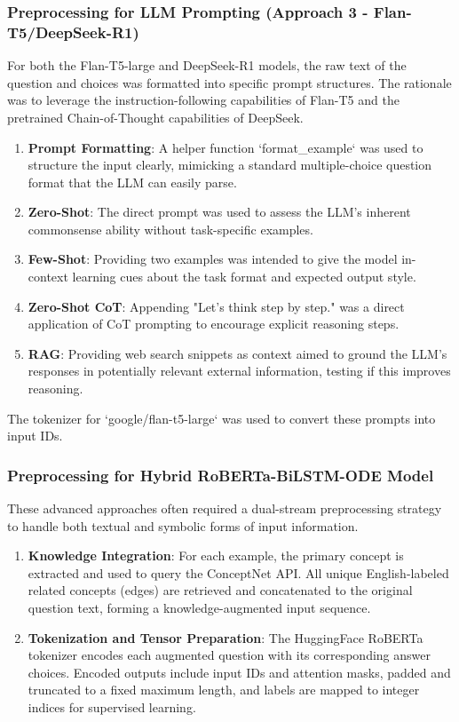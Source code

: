 \documentclass[10.5pt]{article}
\begin{document}
\subsubsection{Preprocessing for LLM Prompting (Approach 3 - Flan-T5/DeepSeek-R1)}
For both the Flan-T5-large and DeepSeek-R1 models, the raw text of the question and choices was formatted into specific prompt structures. The rationale was to leverage the instruction-following capabilities of Flan-T5 and the pretrained Chain-of-Thought capabilities of DeepSeek.
\begin{enumerate}
    \item \textbf{Prompt Formatting}: A helper function `format\_example` was used to structure the input clearly, mimicking a standard multiple-choice question format that the LLM can easily parse.
    \item \textbf{Zero-Shot}: The direct prompt was used to assess the LLM's inherent commonsense ability without task-specific examples.
    \item \textbf{Few-Shot}: Providing two examples was intended to give the model in-context learning cues about the task format and expected output style.
    \item \textbf{Zero-Shot CoT}: Appending "Let's think step by step." was a direct application of CoT prompting to encourage explicit reasoning steps.
    \item \textbf{RAG}: Providing web search snippets as context aimed to ground the LLM's responses in potentially relevant external information, testing if this improves reasoning.
\end{enumerate}
The tokenizer for `google/flan-t5-large` was used to convert these prompts into input IDs.


\subsubsection{Preprocessing for Hybrid RoBERTa-BiLSTM-ODE Model}
These advanced approaches often required a dual-stream preprocessing strategy to handle both textual and symbolic forms of input information.
\begin{enumerate}
    \item \textbf{Knowledge Integration}: For each example, the primary concept is extracted and used to query the ConceptNet API. All unique English-labeled related concepts (edges) are retrieved and concatenated to the original question text, forming a knowledge-augmented input sequence.
    \item \textbf{Tokenization and Tensor Preparation}: The HuggingFace RoBERTa tokenizer encodes each augmented question with its corresponding answer choices. Encoded outputs include input IDs and attention masks, padded and truncated to a fixed maximum length, and labels are mapped to integer indices for supervised learning.
\end{enumerate}
 
\end{document}
